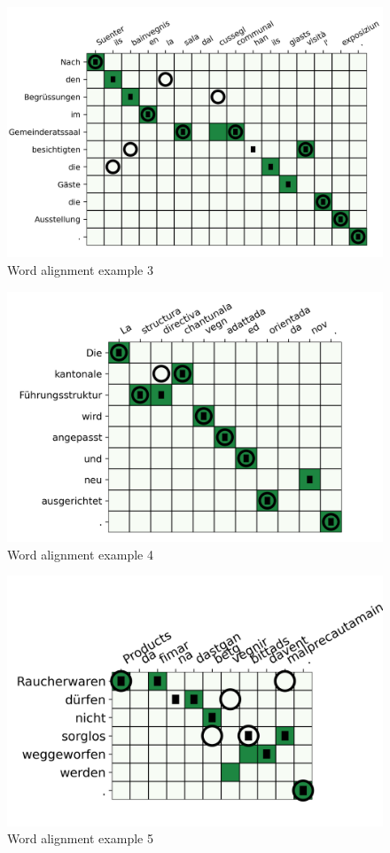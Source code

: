 \begin{figure}[ht]
\includegraphics{graphics/alignments/example3.png}
\caption{Word alignment example 3}
\end{figure}

\begin{figure}[ht]
\includegraphics{graphics/alignments/example4.png}
\caption{Word alignment example 4}
\end{figure}

\begin{figure}[ht]
\includegraphics{graphics/alignments/example5.png}
\caption{Word alignment example 5}
\end{figure}